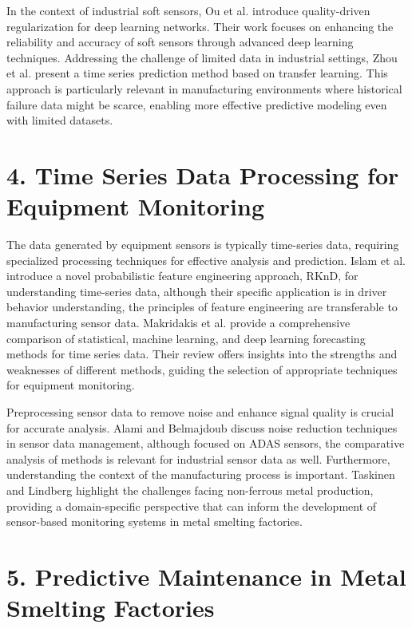 In the context of industrial soft sensors, Ou et al. \cite{ou-2022} introduce quality-driven regularization for deep learning networks. Their work focuses on enhancing the reliability and accuracy of soft sensors through advanced deep learning techniques.  Addressing the challenge of limited data in industrial settings, Zhou et al. \cite{zhou-2022} present a time series prediction method based on transfer learning. This approach is particularly relevant in manufacturing environments where historical failure data might be scarce, enabling more effective predictive modeling even with limited datasets.

\section*{4. Time Series Data Processing for Equipment Monitoring}

The data generated by equipment sensors is typically time-series data, requiring specialized processing techniques for effective analysis and prediction. Islam et al. \cite{islam-2024} introduce a novel probabilistic feature engineering approach, RKnD, for understanding time-series data, although their specific application is in driver behavior understanding, the principles of feature engineering are transferable to manufacturing sensor data.  Makridakis et al. \cite{makridakis-2022} provide a comprehensive comparison of statistical, machine learning, and deep learning forecasting methods for time series data. Their review offers insights into the strengths and weaknesses of different methods, guiding the selection of appropriate techniques for equipment monitoring.

Preprocessing sensor data to remove noise and enhance signal quality is crucial for accurate analysis. Alami and Belmajdoub \cite{alami-2024} discuss noise reduction techniques in sensor data management, although focused on ADAS sensors, the comparative analysis of methods is relevant for industrial sensor data as well.  Furthermore, understanding the context of the manufacturing process is important. Taskinen and Lindberg \cite{taskinen-2024} highlight the challenges facing non-ferrous metal production, providing a domain-specific perspective that can inform the development of sensor-based monitoring systems in metal smelting factories.

\section*{5. Predictive Maintenance in Metal Smelting Factories}

